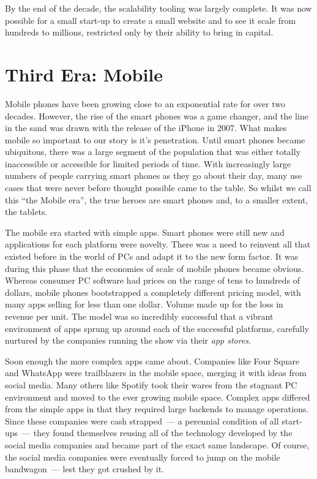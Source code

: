 \documentclass{book}
\begin{document}
By the end of the decade, the scalability tooling was largely
complete. It was now possible for a small start-up to create a small
website and to see it scale from hundreds to millions, restricted only
by their ability to bring in capital.

\section{Third Era: Mobile}

Mobile phones have been growing close to an exponential rate for over
two decades. However, the rise of the smart phones was a game changer,
and the line in the sand was drawn with the release of the iPhone in
2007. What makes mobile so important to our story is it's
penetration. Until smart phones became ubiquitous, there was a large
segment of the population that was either totally inaccessible or
accessible for limited periods of time. With increasingly large
numbers of people carrying smart phones as they go about their day,
many use cases that were never before thought possible came to the
table. So whilst we call this ``the Mobile era'', the true heroes are
smart phones and, to a smaller extent, the tablets.

The mobile era started with simple apps. Smart phones were still new
and applications for each platform were novelty. There was a need to
reinvent all that existed before in the world of PCs and adapt it to
the new form factor. It was during this phase that the economies of
scale of mobile phones became obvious. Whereas consumer PC software
had prices on the range of tens to hundreds of dollars, mobile phones
bootstrapped a completely different pricing model, with many apps
selling for less than one dollar. Volume made up for the loss in
revenue per unit. The model was so incredibly successful that a
vibrant environment of apps sprung up around each of the successful
platforms, carefully nurtured by the companies running the show via
their \emph{app stores}.

Soon enough the more complex apps came about. Companies like Four
Square and WhatsApp were trailblazers in the mobile space, merging it
with ideas from social media. Many others like Spotify took their
wares from the stagnant PC environment and moved to the ever growing
mobile space. Complex apps differed from the simple apps in that they
required large backends to manage operations. Since these companies
were cash strapped~--- a perennial condition of all start-ups~--- they
found themselves reusing all of the technology developed by the social
media companies and became part of the exact same landscape. Of
course, the social media companies were eventually forced to jump on
the mobile bandwagon~--- lest they got crushed by it.
\end{document}
